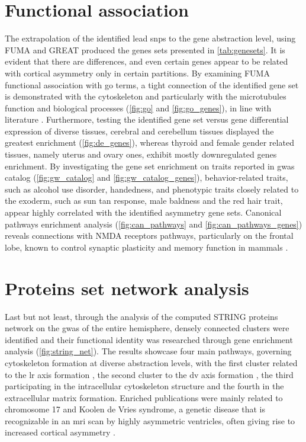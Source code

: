 \section{Functional association}
\label{sec:res_functional}
The extrapolation of the identified lead \acp{snp} to the gene abstraction level, using FUMA and GREAT produced the genes sets presented in \autoref{tab:genesets}. It is evident that there are differences, and even certain genes appear to be related with cortical asymmetry only in certain partitions. By examining FUMA functional association with \ac{go} terms, a tight connection of the identified gene set is demonstrated with the cytoskeleton and particularly with the microtubules function and biological processes (\autoref{fig:go} and \ref{fig:go_genes}), in line with literature \cite{Sha2021}. Furthermore, testing the identified gene set versus gene differential expression of diverse tissues, cerebral and cerebellum tissues displayed the greatest enrichment (\autoref{fig:de_genes}), whereas thyroid and female gender related tissues, namely uterus and ovary ones, exhibit mostly downregulated genes enrichment. By investigating the gene set enrichment on traits reported in \ac{gwas} catalog (\autoref{fig:gw_catalog} and \ref{fig:gw_catalog_genes}), behavior-related traits, such as alcohol use disorder, handedness, and phenotypic traits closely related to the exoderm, such as sun tan response, male baldness and the red hair trait, appear highly correlated with the identified asymmetry gene sets. Canonical pathways enrichment analysis (\autoref{fig:can_pathways} and \ref{fig:can_pathways_genes}) reveals connections with NMDA receptors pathways, particularly on the frontal lobe,  known to control synaptic plasticity and memory function in mammals \cite{Li2009}.

\section{Proteins set network analysis}

Last but not least, through the analysis of the computed STRING proteins network on the \ac{gwas} of the entire hemisphere, densely connected clusters were identified and their functional identity was researched through gene enrichment analysis (\autoref{fig:string_net}). The results showcase four main pathways, governing cytoskeleton formation at diverse abstraction levels, with the first cluster related to the \ac{lr} axis formation \cite{Hu2017}, the second cluster to the \ac{dv} axis formation \cite{Hikasa2013}, the third participating in the intracellular cytoskeleton structure and the fourth in the extracellular matrix formation. Enriched publications were mainly related to chromosome 17 and Koolen de Vries syndrome, a genetic disease that is recognizable in an \ac{mri} scan by highly asymmetric ventricles, often giving rise to increased cortical asymmetry \cite{Myers2017}.

